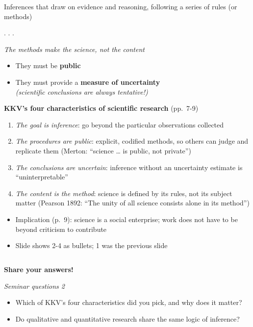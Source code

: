 \documentclass[
  letterpaper,
  DIV=11,
  numbers=noendperiod]{scrartcl}
\providecommand{\tightlist}{%
  \setlength{\itemsep}{0pt}\setlength{\parskip}{0pt}}
\begin{document}
Inferences that draw on evidence and reasoning, following a series of
rules (or methods)

. . .

\emph{The methods make the science, not the content}

\begin{itemize}
\tightlist
\item
  They must be \textbf{public}\\
\item
  They must provide a \textbf{measure of uncertainty}\\
  \emph{(scientific conclusions are always tentative!)}
\end{itemize}

\textbf{KKV's four characteristics of scientific research} (pp.~7-9)

\begin{enumerate}
\def\labelenumi{\arabic{enumi}.}
\tightlist
\item
  \emph{The goal is inference}: go beyond the particular observations
  collected
\item
  \emph{The procedures are public}: explicit, codified methods, so
  others can judge and replicate them (Merton: ``science \ldots{} is
  public, not private'')
\item
  \emph{The conclusions are uncertain}: inference without an uncertainty
  estimate is ``uninterpretable''
\item
  \emph{The content is the method}: science is defined by its rules, not
  its subject matter (Pearson 1892: ``The unity of all science consists
  alone in its method'')
\end{enumerate}

\begin{itemize}
\tightlist
\item
  Implication (p.~9): science is a social enterprise; work does not have
  to be beyond criticism to contribute
\item
  Slide shows 2-4 as bullets; 1 was the previous slide
\end{itemize}

\subsection{}\label{section}

\textbf{Share your answers!}

{\emph{Seminar questions 2}}

\begin{itemize}
\item
  Which of KKV's four characteristics did you pick, and why does it
  matter?
\item
  Do qualitative and quantitative research share the same logic of
  inference?
\end{itemize}
\end{document}
